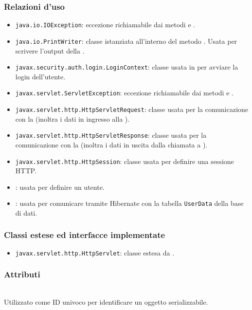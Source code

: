 \subsubsection*{Relazioni d'uso}
\begin{itemize}
	\item \texttt{java.io.IOException}: eccezione richiamabile dai metodi  e .
	\item \texttt{java.io.PrintWriter}: classe istanziata all'interno del metodo . Usata per scrivere l'output della .
	\item \texttt{javax.security.auth.login.LoginContext}: classe usata in  per avviare la login dell'utente.
	\item \texttt{javax.servlet.ServletException}: eccezione richiamabile dai metodi  e .
	\item \texttt{javax.servlet.http.HttpServletRequest}:  classe usata per la comunicazione con la  (inoltra i dati in ingresso alla ).
	\item \texttt{javax.servlet.http.HttpServletResponse}: classe usata per la comunicazione con la  (inoltra i dati in uscita dalla chiamata a ).
	\item \texttt{javax.servlet.http.HttpSession}: classe usata per definire una sessione HTTP.
	\item {}: usata per definire un utente.
	\item {}: usata per comunicare tramite Hibernate con la tabella \texttt{UserData} della base di dati.
\end{itemize}

\subsubsection*{Classi estese ed interfacce implementate}
\begin{itemize}
	\item \texttt{javax.servlet.http.HttpServlet}: classe estesa da .
\end{itemize}

\subsubsection*{Attributi}
\begin{description}
  \item{}\\
  Utilizzato come ID univoco per identificare un oggetto serializzabile.
\end{description}


